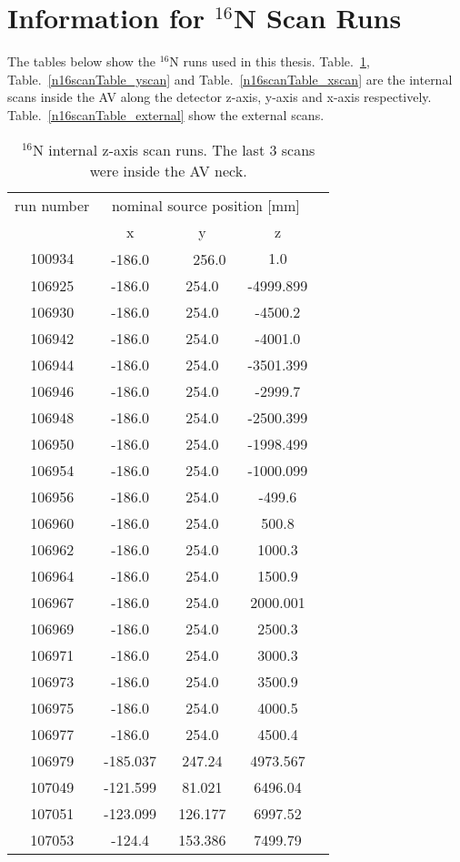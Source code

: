 \section{Information for $^{16}$N Scan Runs}
The tables below show the $^{16}$N runs used in this thesis. Table.~\ref{n16scanTable_zscan}, Table.~\ref{n16scanTable_yscan} and Table.~\ref{n16scanTable_xscan} are the internal scans inside the AV along the detector z-axis, y-axis and x-axis respectively. Table.~\ref{n16scanTable_external} show the external scans.
\begin{table}[ht]\label{n16scanTable_zscan}
		\caption[]{$^{16}$N internal z-axis scan runs. The last 3 scans were inside the AV neck.}
			\centering
	\begin{tabular*}{90mm}{c@{\extracolsep{\fill}}*4c}
		\toprule 
		run number  & \multicolumn{3}{c}{nominal source position [mm]}  \\
                                \cline{2-4}
			& x & y & z\\
		\midrule
        100934 &-186.0　&　256.0　& 1.0\\
        106925 &-186.0 &254.0  &-4999.899\\
        106930 &-186.0 & 254.0 & -4500.2\\
        106942 &-186.0 & 254.0 & -4001.0\\
        106944 &-186.0 & 254.0 & -3501.399\\
        106946 &-186.0 & 254.0 & -2999.7\\
        106948 &-186.0 & 254.0 & -2500.399\\
        106950 &-186.0 & 254.0 & -1998.499\\
        106954 &-186.0 & 254.0 & -1000.099\\
        106956 &-186.0 & 254.0 & -499.6\\
        106960 &-186.0 & 254.0 & 500.8\\
        106962 &-186.0 & 254.0 & 1000.3\\
        106964 &-186.0 & 254.0 & 1500.9\\
        106967 &-186.0 & 254.0 & 2000.001\\
        106969 &-186.0 & 254.0 & 2500.3\\
        106971 &-186.0 & 254.0 & 3000.3\\
        106973 &-186.0 & 254.0 & 3500.9\\
        106975 &-186.0 & 254.0 & 4000.5\\
        106977 &-186.0 & 254.0 & 4500.4\\
        106979 &-185.037 & 247.24 & 4973.567\\
        107049 & -121.599 & 81.021 & 6496.04 \\
        107051 & -123.099 & 126.177 & 6997.52\\
        107053	&	-124.4 & 153.386 & 7499.79\\
        \bottomrule	
	\end{tabular*}
\end{table}        
        
